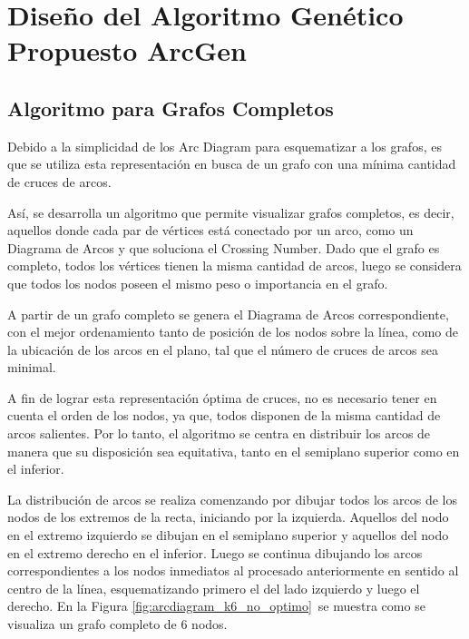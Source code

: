 \chapter{Diseño del Algoritmo Genético Propuesto ArcGen}\label{cap3}

\section{Algoritmo para Grafos Completos}
	Debido  a la  simplicidad de los Arc Diagram para esquematizar a los  grafos,  es que se  utiliza esta representación en busca de un grafo con una mínima cantidad de cruces de arcos.
	
	Así, se desarrolla  un algoritmo que permite visualizar  grafos  completos, es decir, aquellos donde cada par de vértices está conectado por un arco, como un Diagrama de Arcos y que  soluciona el Crossing Number.
    Dado que el  grafo es completo, todos  los vértices tienen la misma cantidad de arcos,  luego se considera que todos los nodos poseen el mismo peso o importancia en el grafo. %

	
	
	A partir de un grafo completo se  genera  el  Diagrama de Arcos correspondiente, con  el mejor ordenamiento tanto de posición de los nodos sobre la línea, como de la ubicación de los arcos en el  plano,  tal que el número de cruces de arcos sea minimal.
	
	A fin de lograr esta representación óptima de cruces, no es necesario tener en cuenta el orden de los nodos, ya que, todos disponen de la misma cantidad de arcos salientes. Por lo tanto, el algoritmo se centra en distribuir los arcos de manera que su disposición sea equitativa, tanto en el semiplano  superior como en el inferior.
	
	La distribución de arcos se realiza comenzando por  dibujar  todos los arcos de los nodos de los extremos de la  recta, iniciando por la izquierda. Aquellos del nodo en el extremo  izquierdo  se dibujan en el semiplano  superior y aquellos del  nodo en el extremo  derecho en el inferior. Luego se continua dibujando los arcos correspondientes a los  nodos inmediatos al  procesado anteriormente en sentido al  centro de la línea, esquematizando primero el del lado izquierdo y luego el derecho. En la Figura \ref{fig:arcdiagram_k6_no_optimo}\ se muestra como  se visualiza  un grafo completo de 6 nodos.
	
